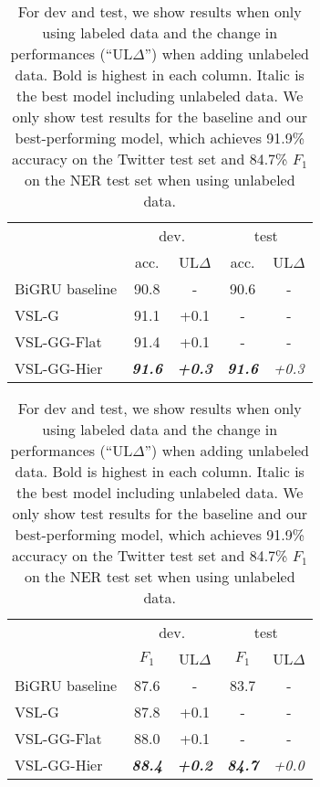 \documentclass[11pt,a4paper]{article}
\newcommand{\vsmg}{VSL-G\xspace}
\newcommand{\vsmggflat}{VSL-GG-Flat\xspace}
\newcommand{\vsmgghier}{VSL-GG-Hier\xspace}
\begin{document}
\begin{table}[t]
\setlength{\tabcolsep}{3pt}
\begin{subtable}{.5\textwidth}
\centering
\begin{tabular}{l|c|c|c|c}
        & \multicolumn{2}{c|}{dev.} & \multicolumn{2}{c}{test} \\
        & \multicolumn{1}{c}{acc.} & UL$\Delta$ & \multicolumn{1}{c}{acc.} & UL$\Delta$ \\
\hline
BiGRU baseline     & 90.8  & -    & 90.6 & -  \\
\vsmg              & 91.1  &  +0.1 &   -  & -  \\
\vsmggflat            & 91.4  &  +0.1 &   -  & -  \\
\vsmgghier            & \textit{\textbf{91.6}}  & \textit{\textbf{+0.3}}  &   \textit{\textbf{91.6}}   &  \textit{+0.3} \\
\end{tabular}
\caption{Twitter tagging accuracies (\%)}
\label{twitter-res}
\end{subtable}

\begin{subtable}{.5\textwidth}
\centering
\begin{tabular}{l|c|c|c|c}
        & \multicolumn{2}{c|}{dev.} & \multicolumn{2}{c}{test} \\
        & \multicolumn{1}{c}{$F_{1}$} & UL$\Delta$ & \multicolumn{1}{c}{$F_{1}$} & UL$\Delta$ \\
\hline
BiGRU baseline     & 87.6  & -    & 83.7 & -  \\
\vsmg              & 87.8  & +0.1  &   -  & -  \\
\vsmggflat         & 88.0  & +0.1  &   -  & -  \\
\vsmgghier         & \textit{\textbf{88.4}}  & \textit{\textbf{+0.2}} &  \textit{\textbf{84.7}}    &    \textit{+0.0} \\
\end{tabular}
\caption{NER $F_{1}$ score (\%)}
\label{ner-res}
\end{subtable}
\caption{For dev and test, we show results when only using labeled data and the change in performances (``UL$\Delta$'') when adding unlabeled data. Bold is highest in each column. Italic is the best model including unlabeled data. We only show test results for the baseline and our best-performing model, which achieves 91.9\% accuracy on the Twitter test set and 84.7\% $F_1$ on the NER test set when using unlabeled data.}
\end{table}
\end{document}
